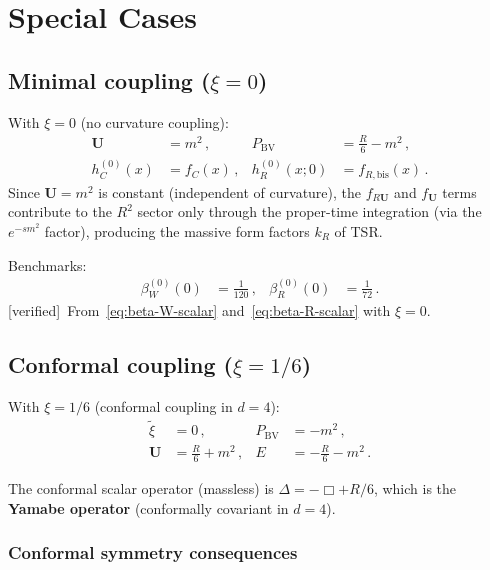 \documentclass[12pt,a4paper]{article}
\theoremstyle{definition}
\theoremstyle{remark}
\newcommand{\verified}{\textcolor{green!50!black}{\textsf{[verified]}}}
\begin{document}
\section{Special Cases}
\label{sec:special}

\subsection{Minimal coupling ($\xi = 0$)}

With $\xi = 0$ (no curvature coupling):
\begin{align}
  \mathbf{U} &= m^2\,, & P_{\mathrm{BV}} &= \frac{R}{6} - m^2\,,
  \nonumber\\
  h_C^{(0)}(x) &= f_C(x)\,, &
  h_R^{(0)}(x; 0) &= f_{R,\mathrm{bis}}(x)\,.
  \label{eq:minimal-coupling}
\end{align}
Since $\mathbf{U} = m^2$ is constant (independent of curvature),
the $f_{R\mathbf{U}}$ and $f_{\mathbf{U}}$ terms contribute to
the $R^2$ sector only through the proper-time integration (via
the $e^{-sm^2}$ factor), producing the massive form factors
$k_R$ of TSR.

\medskip\noindent
Benchmarks:
\begin{align}
  \beta_W^{(0)}(0) &= \frac{1}{120}\,, &
  \beta_R^{(0)}(0) &= \frac{1}{72}\,. \label{eq:beta-minimal}
\end{align}
\verified\ From~\eqref{eq:beta-W-scalar} and~\eqref{eq:beta-R-scalar}
with $\xi=0$.

\subsection{Conformal coupling ($\xi = 1/6$)}

With $\xi = 1/6$ (conformal coupling in $d = 4$):
\begin{align}
  \tilde{\xi} &= 0\,, & P_{\mathrm{BV}} &= -m^2\,,
  \nonumber\\
  \mathbf{U} &= \frac{R}{6} + m^2\,, & E &= -\frac{R}{6} - m^2\,.
\end{align}

The conformal scalar operator (massless) is $\Delta = -\Box + R/6$,
which is the \textbf{Yamabe operator} (conformally covariant in $d=4$).

\subsubsection{Conformal symmetry consequences}
\end{document}
